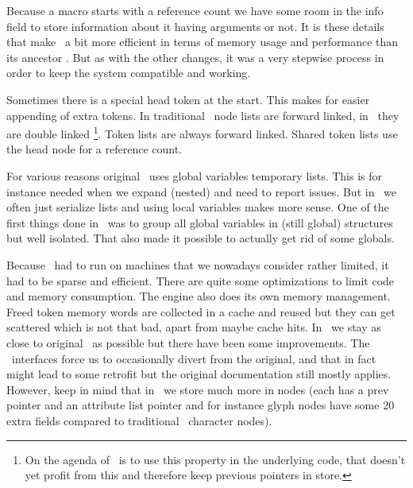 Because a macro starts with a reference count we have some room in the info field
to store information about it having arguments or not. It is these details that
make \LUAMETATEX\ a bit more efficient in terms of memory usage and performance
than its ancestor \LUATEX. But as with the other changes, it was a very stepwise
process in order to keep the system compatible and working.

\stopsectionlevel

\startsectionlevel[title=Some implementation details]

Sometimes there is a special head token at the start. This makes for easier
appending of extra tokens. In traditional \TEX\ node lists are forward linked, in
\LUATEX\ they are double linked \footnote {On the agenda of \LUAMETATEX\ is to
use this property in the underlying code, that doesn't yet profit from this and
therefore keep previous pointers in store.}. Token lists are always forward
linked. Shared token lists use the head node for a reference count.

For various reasons original \TEX\ uses global variables temporary lists. This is
for instance needed when we expand (nested) and need to report issues. But in
\LUATEX\ we often just serialize lists and using local variables makes more
sense. One of the first things done in \LUAMETATEX\ was to group all global
variables in (still global) structures but well isolated. That also made it
possible to actually get rid of some globals.

Because \TEX\ had to run on machines that we nowadays consider rather limited, it
had to be sparse and efficient. There are quite some optimizations to limit code
and memory consumption. The engine also does its own memory management. Freed
token memory words are collected in a cache and reused but they can get scattered
which is not that bad, apart from maybe cache hits. In \LUAMETATEX\ we stay as
close to original \TEX\ as possible but there have been some improvements. The
\LUA\ interfaces force us to occasionally divert from the original, and that in
fact might lead to some retrofit but the original documentation still mostly
applies. However, keep in mind that in \LUATEX\ we store much more in nodes (each
has a prev pointer and an attribute list pointer and for instance glyph nodes
have some 20 extra fields compared to traditional \TEX\ character nodes).

\stopsectionlevel

\startsectionlevel[title=Other data management]

